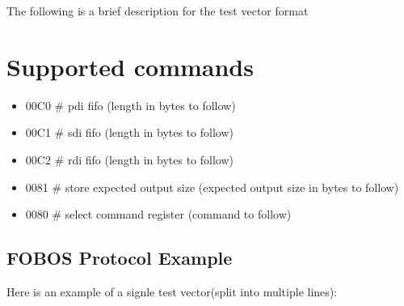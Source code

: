 \documentclass[letterpaper,10pt,english]{sphinxmanual}
\begin{document}
The following is a brief description for the test vector format


\section{Supported commands}
\label{\detokenize{tvgen:supported-commands}}\begin{itemize}
\item {} 
00C0 \# pdi fifo (length in bytes to follow)

\item {} 
00C1 \# sdi fifo (length in bytes to follow)

\item {} 
00C2 \# rdi fifo (length in bytes to follow)

\item {} 
0081 \# store expected output size (expected output size in bytes to follow)

\item {} 
0080 \# select command register (command to follow)

\end{itemize}


\subsection{FOBOS Protocol Example}
\label{\detokenize{tvgen:fobos-protocol-example}}
Here is an example of a signle test vector(split into multiple lines):

\begin{sphinxVerbatim}[commandchars=\\\{\}]
 
 
 
 
 
 
 
 
 
 
\end{sphinxVerbatim}
\end{document}
